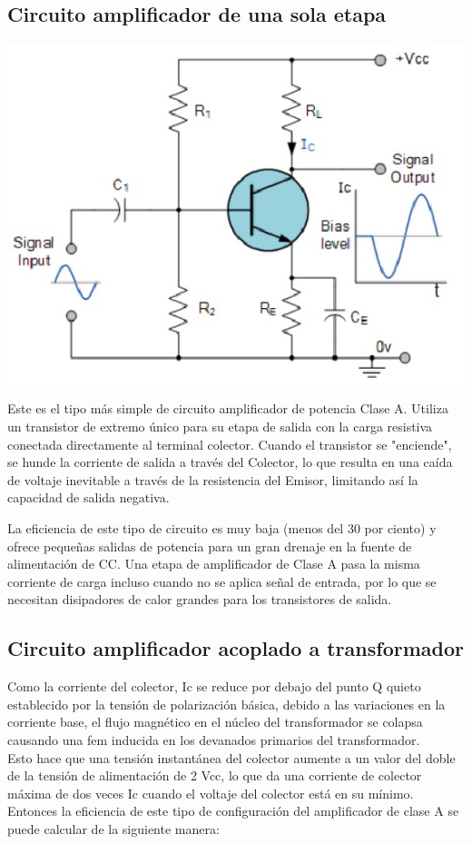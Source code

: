 \documentclass[12pt,a4paper]{article}
\begin{document}
\subsection{Circuito amplificador de una sola etapa}
\includegraphics[scale=.8]{imagenes/1ETAPA.JPG} 
\begin{flushleft}
Este es el tipo más simple de circuito amplificador de potencia Clase A. Utiliza un transistor de extremo único para su etapa de salida con la carga resistiva conectada directamente al terminal colector. Cuando el transistor se "enciende", se hunde la corriente de salida a través del Colector, lo que resulta en una caída de voltaje inevitable a través de la resistencia del Emisor, limitando así la capacidad de salida negativa.\linebreak

La eficiencia de este tipo de circuito es muy baja (menos del 30 por ciento) y ofrece pequeñas salidas de potencia para un gran drenaje en la fuente de alimentación de CC. Una etapa de amplificador de Clase A pasa la misma corriente de carga incluso cuando no se aplica señal de entrada, por lo que se necesitan disipadores de calor grandes para los transistores de salida.\\
\end{flushleft}
\newpage
\begin{flushleft}
\subsection{Circuito amplificador acoplado a transformador}
Como la corriente del colector, Ic se reduce por debajo del punto Q quieto establecido por la tensión de polarización básica, debido a las variaciones en la corriente base, el flujo magnético en el núcleo del transformador se colapsa causando una fem inducida en los devanados primarios del transformador. \\
Esto hace que una tensión instantánea del colector aumente a un valor del doble de la tensión de alimentación de 2 Vcc, lo que da una corriente de colector máxima de dos veces Ic cuando el voltaje del colector está en su mínimo. Entonces la eficiencia de este tipo de configuración del amplificador de clase A se puede calcular de la siguiente manera: 
\end{flushleft}
\end{document}
